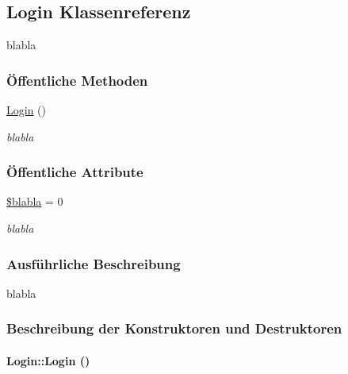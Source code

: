 \hypertarget{classLogin}{
\subsection{Login Klassenreferenz}
\label{classLogin}
}
blabla  


\subsubsection*{\"{O}ffentliche Methoden}
\begin{CompactItemize}
\item 
\hyperlink{classLogin_4847f3e07e43b540d3339392346f87ff}{Login} ()
\begin{CompactList}\small\item\em blabla \item\end{CompactList}\end{CompactItemize}
\subsubsection*{\"{O}ffentliche Attribute}
\begin{CompactItemize}
\item 
\hyperlink{classLogin_00bf0b2858a6ecc754cd00e7b21798e3}{\$blabla} = 0
\begin{CompactList}\small\item\em blabla \item\end{CompactList}\end{CompactItemize}


\subsubsection{Ausf\"{u}hrliche Beschreibung}
blabla 



\subsubsection{Beschreibung der Konstruktoren und Destruktoren}
\hypertarget{classLogin_4847f3e07e43b540d3339392346f87ff}{
\paragraph[Login]{\setlength{\rightskip}{0pt plus 5cm}Login::Login ()}\hfill}
\label{classLogin_4847f3e07e43b540d3339392346f87ff}


